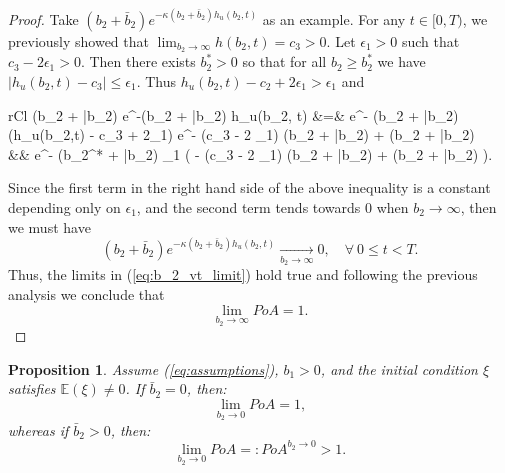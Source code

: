 \documentclass[11pt]{article}
\newtheorem{proposition}{Proposition}
\begin{document}
\begin{proof}
	Take $(b_2 + \bar{b}_2) e^{-\kappa (b_2 + \bar{b}_2) h_u(b_2,t)}$ as an example. For any $t \in [0,T)$, we previously showed that $\lim_{b_2 \to \infty} h(b_2,t) = c_3 >0$. Let $\epsilon_1 >0$ such that $c_3 - 2 \epsilon_1 >0$. Then there exists $b_2^* > 0$ so that for all $b_2 \geq b_2^{*}$ we have $\vert h_u(b_2,t) - c_3 \vert \leq \epsilon_1$. Thus $h_u(b_2,t) - c_2 + 2 \epsilon_1 > \epsilon_1$ and 
	\begin{IEEEeqnarray*}{rCl}
		(b_2 + \bar{b}_2) e^{-\kappa (b_2 + \bar{b}_2) h_u(b_2, t)} &=& e^{- \kappa (b_2 + \bar{b}_2) (h_u(b_2,t) - c_3 + 2\epsilon_1)} \cdot e^{- \kappa (c_3 - 2 \epsilon_1) (b_2 + \bar{b}_2) + \ln(b_2 + \bar{b}_2) } \\
		&\leq & e^{- \kappa (b_2^* + \bar{b}_2) \epsilon_1} \cdot \exp \left( - \kappa(c_3 - 2 \epsilon_1) (b_2 + \bar{b}_2) + \ln(b_2 + \bar{b}_2) \right).
	\end{IEEEeqnarray*}
	Since the first term in the right hand side of the above inequality is a constant depending only on $\epsilon_1$, and the second term tends towards $0$ when $b_2 \to \infty$, then we must have
	$$ (b_2 + \bar{b}_2) e^{-\kappa (b_2 + \bar{b}_2) h_u(b_2,t)} \xrightarrow[b_2\to \infty]{} 0, \quad \forall\   0 \leq t < T. $$
	Thus, the limits in (\ref{eq:b_2_vt_limit}) hold true and following the previous analysis we conclude that 
	$$ \lim_{b_2 \to \infty} PoA = 1.$$
\end{proof}

\begin{proposition}
	Assume (\ref{eq:assumptions}), $b_1 > 0$, and the initial condition $\xi$ satisfies $\mathbb{E}(\xi)\neq 0$. If $\bar{b}_2= 0$, then:
	\begin{equation*}
	\lim_{b_2 \to 0} PoA = 1,
	\end{equation*}
	whereas if $\bar{b}_2 > 0$, then:
	\begin{equation*}
	\lim_{b_2 \to 0} PoA =: PoA^{b_2\to 0} > 1.
	\end{equation*}
\label{prop:b2_to_0}
\end{proposition}
\end{document}
